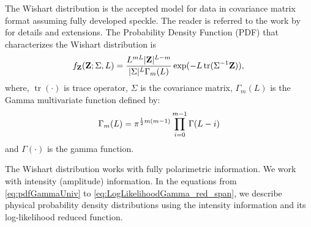 \documentclass[remotesensing,article,submit,pdftex,moreauthors]{Definitions/mdpi}
\DeclareMathOperator{\traco}{tr} %
\begin{document}
The Wishart distribution is the accepted model for data in covariance matrix format assuming fully developed speckle.
The reader is referred to the work by \citet{PolSARModelswithMultimodalIntensities} for details and extensions.
The Probability Density Function (PDF) that characterizes the Wishart distribution is
\begin{equation}\label{cap_acf_9}
    f_{\mathbf{Z}}(\mathbf{Z};\Sigma,L)=\frac{L^{mL}|\mathbf{Z}|^{L-m}}{|\Sigma|^{L}\Gamma_m(L)} \exp(-L\traco(\Sigma^{-1}\mathbf{Z})), \\
\end{equation}
where, $\traco(\cdot)$ is trace operator, $\Sigma$ is the covariance matrix,  $\Gamma_m(L)$ is the Gamma multivariate function defined by:
\begin{equation}\label{multi_gamma_func}
	\Gamma_m(L)=\pi^{\frac{1}{2}m(m-1)} \prod_{i=0}^{m-1}\Gamma(L-i) \\
\end{equation}
and $\Gamma(\cdot)$ is the gamma function. 

The Wishart distribution works with fully polarimetric information. We work with intensity (amplitude) information. In the equations from \eqref{eq:pdfGammaUniv} to \eqref{eq:LogLikelihoodGamma_red_span}, we describe physical probability density distributions using the intensity information and its log-likelihood reduced function.
\end{document}
